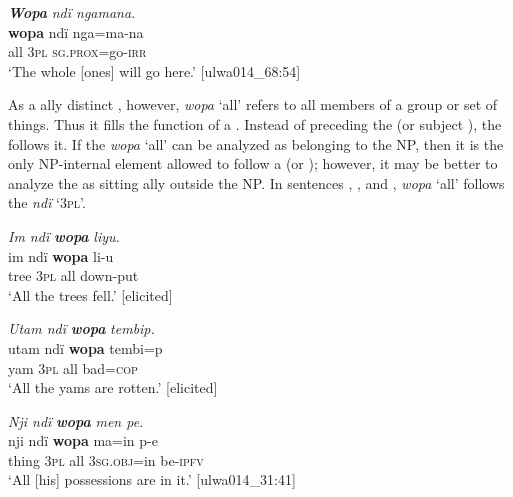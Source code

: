 \ea%
    \label{ex:det:165}
          \textbf{\textit{Wopa}} \textit{ndï ngamana.}\\
\gll    \textbf{wopa}  ndï  nga=ma-na\\
    all    3\textsc{pl}  \textsc{sg.prox}=go-\textsc{irr}\\
\glt `The whole [ones] will go here.’ [ulwa014\_68:54]
\z

As a ally distinct , however, \textit{wopa} ‘all’ refers to all members of a group or set of things. Thus it fills the function of a  . Instead of preceding the  (or subject ), the  follows it. If the  \textit{wopa} ‘all’ can be analyzed as belonging to the NP, then it is the only NP-internal element allowed to follow a  (or ); however, it may be better to analyze the  as sitting ally outside the NP. In sentences , , and , \textit{wopa} ‘all’ follows the   \textit{ndï} `3\textsc{pl}’.



\ea%
    \label{ex:det:166}
          \textit{Im ndï} \textbf{\textit{wopa}} \textit{liyu.}\\
\gll    im    ndï  \textbf{wopa}  li-u\\
    tree  3\textsc{pl}  all    down-put\\
\glt `All the trees fell.’ [elicited]
\z

\ea%
    \label{ex:det:167}
          \textit{Utam ndï} \textbf{\textit{wopa}} \textit{tembip.}\\
\gll    utam  ndï  \textbf{wopa}  tembi=p\\
    yam  \textsc{3pl}  all    bad=\textsc{cop}\\
\glt `All the yams are rotten.’ [elicited]
\z

\ea%
    \label{ex:det:168}
          \textit{Nji ndï} \textbf{\textit{wopa}} \textit{men pe.}\\
\gll    nji    ndï  \textbf{wopa}  ma=in      p-e\\
    thing  3\textsc{pl}  all    3\textsc{sg.obj}=in  be\textsc{{}-ipfv}\\
\glt `All [his] possessions are in it.’ [ulwa014\_31:41]
\z

